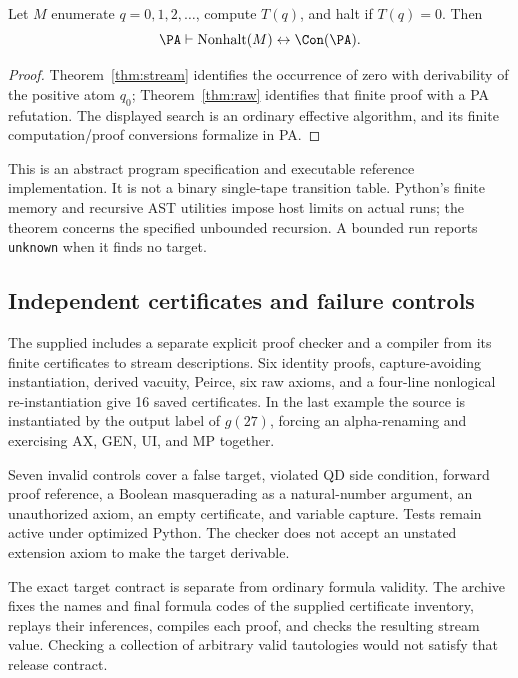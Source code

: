 \begin{corollary}\label{cor:search}
Let $M$ enumerate $q=0,1,2,\ldots$, compute $T(q)$, and halt if $T(q)=0$. Then
\[
                 \PA\vdash\operatorname{Nonhalt}(M)
                                             \leftrightarrow\Con(\PA).
\]
\end{corollary}
\begin{proof}
Theorem~\ref{thm:stream} identifies the occurrence of zero with derivability of the positive atom $q_0$; Theorem~\ref{thm:raw} identifies that finite proof with a PA refutation. The displayed search is an ordinary effective algorithm, and its finite computation/proof conversions formalize in PA.
\end{proof}

This is an abstract program specification and executable reference implementation. It is not a binary single-tape transition table. Python's finite memory and recursive AST utilities impose host limits on actual runs; the theorem concerns the specified unbounded recursion. A bounded run reports \texttt{unknown} when it finds no target.

\subsection{Independent certificates and failure controls}

The supplied  includes a separate explicit proof checker and a compiler from its finite certificates to stream descriptions. Six identity proofs, capture-avoiding instantiation, derived vacuity, Peirce, six raw axioms, and a four-line nonlogical re-instantiation give 16 saved certificates. In the last example the source is instantiated by the output label of $g(27)$, forcing an alpha-renaming and exercising AX, GEN, UI, and MP together.

Seven invalid controls cover a false target, violated QD side condition, forward proof reference, a Boolean masquerading as a natural-number argument, an unauthorized axiom, an empty certificate, and variable capture. Tests remain active under optimized Python. The checker does not accept an unstated extension axiom to make the target derivable.

The exact target contract is separate from ordinary formula validity. The archive fixes the names and final formula codes of the supplied certificate inventory, replays their inferences, compiles each proof, and checks the resulting stream value. Checking a collection of arbitrary valid tautologies would not satisfy that release contract.
